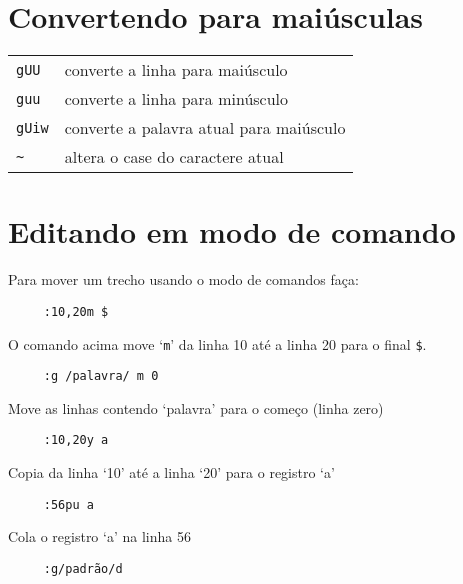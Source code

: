 \section{Convertendo para maiúsculas}
\label{sec:Convertendo para maiúsculas}

\begin{table}[htb]\begin{center} \begin{tabular}{ll} \hline
     \verb|gUU| & converte a linha para maiúsculo\\
     \verb|guu| & converte a linha para minúsculo\\
     \verb|gUiw| &  converte a palavra atual para maiúsculo\\
     \verb|~| & altera o case do caractere atual\\
\hline \end{tabular}\end{center}\end{table}

\section{Editando em modo de comando}
\label{sec:Editando em modo de comando}

Para mover um trecho usando o modo de comandos faça:

\begin{verbatim}
     :10,20m $
\end{verbatim}

O comando acima move `{\tt m}' da linha 10 até a linha 20 para o final \verb|$|.

\begin{verbatim}
     :g /palavra/ m 0
\end{verbatim}

Move as linhas contendo `palavra' para o começo (linha zero)

\begin{verbatim}
     :10,20y a
\end{verbatim}

Copia da linha `10' até a linha `20' para o registro `a'

\begin{verbatim}
     :56pu a
\end{verbatim}

Cola o registro `a' na linha 56

\begin{verbatim}
     :g/padrão/d
\end{verbatim}

